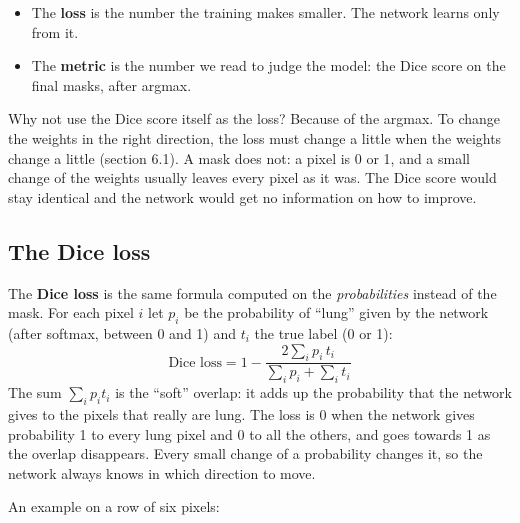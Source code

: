 \documentclass[11pt,a4paper]{article}
\newcommand{\term}[1]{\textbf{#1}}
\begin{document}
\begin{itemize}
\item The \term{loss} is the number the training makes smaller. The network learns only from it.
\item The \term{metric} is the number we read to judge the model: the Dice score on the final masks, after
argmax.
\end{itemize}

Why not use the Dice score itself as the loss? Because of the argmax. To change the weights in the right
direction, the loss must change a little when the weights change a little (section 6.1). A mask does not: a
pixel is 0 or 1, and a small change of the weights usually leaves every pixel as it was. The Dice score would
stay identical and the network would get no information on how to improve.

\subsection{The Dice loss}

The \term{Dice loss} \cite{milletari2016vnet} is the same formula computed on the \emph{probabilities} instead of the mask. For each
pixel $i$ let $p_i$ be the probability of ``lung'' given by the network (after softmax, between 0 and 1) and
$t_i$ the true label (0 or 1):
\[
\text{Dice loss} = 1 - \frac{2 \sum_i p_i\, t_i}{\sum_i p_i + \sum_i t_i}
\]
The sum $\sum_i p_i t_i$ is the ``soft'' overlap: it adds up the probability that the network gives to the
pixels that really are lung. The loss is 0 when the network gives probability 1 to every lung pixel and 0 to
all the others, and goes towards 1 as the overlap disappears. Every small change of a probability changes it,
so the network always knows in which direction to move.

An example on a row of six pixels:

\begin{center}
\end{center}
\end{document}
